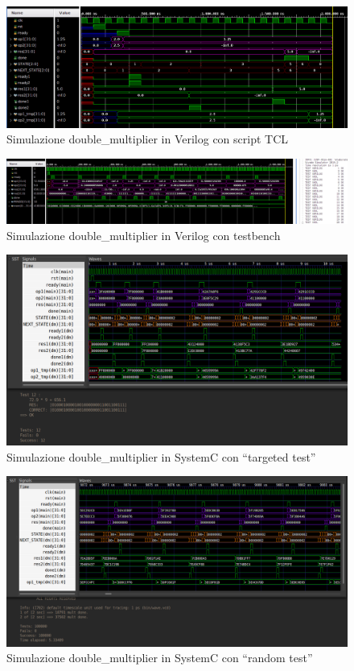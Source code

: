 \documentclass[]{IEEEtran}
\begin{document}
\begin{figure}[bt]
    \centering
    \includegraphics[width=\textwidth]{figures/sim_dm}
    \caption{Simulazione double\_multiplier in Verilog con script TCL}
    \label{fig:SIM_DM}
\end{figure}

\begin{figure}[bt]
    \centering
    \includegraphics[width=\textwidth]{figures/sim_testbench}
    \caption{Simulazione double\_multiplier in Verilog con testbench}
    \label{fig:SIM_TESTBENCH}
\end{figure}

\begin{figure}[bt]
    \centering
    \includegraphics[width=\textwidth]{figures/sim_systemc_target}
    \caption{Simulazione double\_multiplier in SystemC con ``targeted test''}
    \label{fig:SIM_SC_TARGET}
\end{figure}

\begin{figure}[bt]
    \centering
    \includegraphics[width=\textwidth]{figures/sim_systemc_rnd}
    \caption{Simulazione double\_multiplier in SystemC con ``random test''}
    \label{fig:SIM_SC_RND}
\end{figure}
\end{document}
